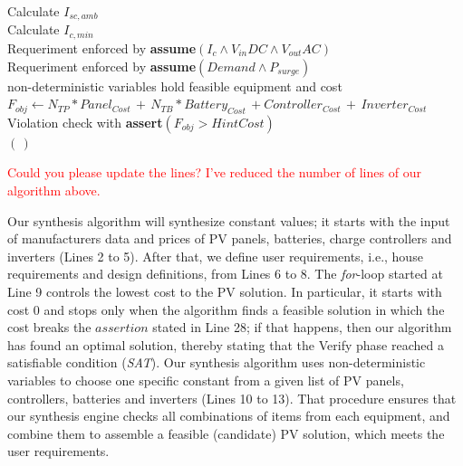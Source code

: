 \documentclass[10pt,conference]{IEEEtran}
\begin{document}
\begin{algorithm}
\begin{algorithmic}[1]
\begin{scriptsize}
 	\STATE Calculate $I_{sc,amb}$ \\
 	\STATE Calculate $I_{c,min}$ \\
 	\STATE Requeriment enforced by \textbf{assume}$(I_{c} \wedge V_{in}DC \wedge V_{out}AC)$ \\
	\STATE Requeriment enforced by \textbf{assume}$(Demand \wedge P_{surge})$ \\
	\STATE non-deterministic variables hold feasible equipment and cost  \\
	\STATE $F_{obj} \leftarrow  N_{TP}*Panel_{Cost} \, + \, N_{TB}*Battery_{Cost} \, + Controller_{Cost} \, + \, Inverter_{Cost}$ \\
	\STATE Violation check with \textbf{assert}$(F_{obj} > HintCost)$ \\
  \ENDFOR
 \RETURN $(\,)$ 
  \end{scriptsize}
 \end{algorithmic} 
 \label{alg:verification-algorithm}
 \end{algorithm}
 
 \textcolor{red}{Could you please update the lines? I've reduced the number of lines of our algorithm above.}
 
Our synthesis algorithm will synthesize constant values; it starts with the input of manufacturers data and prices of PV panels, batteries, charge controllers and inverters (Lines 2 to 5). After that, we define user requirements, i.e., house requirements and design definitions, from Lines 6 to 8. The \textit{for}-loop started at Line 9 controls the lowest cost to the PV solution. In particular, it starts with cost $0$ and stops only when the algorithm finds a feasible solution in which the cost breaks the $assertion$ stated in Line 28; if that happens, then our algorithm has found an optimal solution, thereby stating that the {\sc Verify} phase reached a satisfiable condition (\textit{SAT}). Our synthesis algorithm uses non-deterministic variables to choose one specific constant from a given list of PV panels, controllers, batteries and inverters (Lines 10 to 13). That procedure ensures that our synthesis engine checks all combinations of items from each equipment, and combine them to assemble a feasible (candidate) PV solution, which meets the user requirements.
\end{document}
